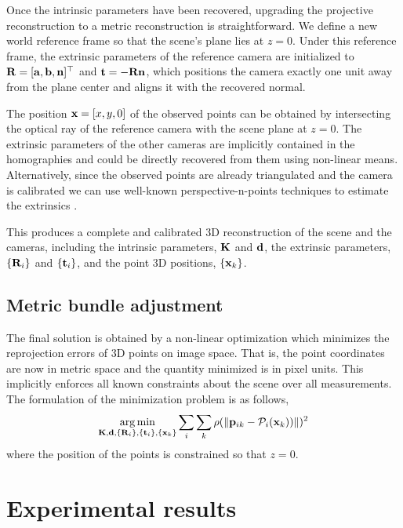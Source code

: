 \documentclass[10pt,twocolumn,letterpaper]{article}
\begin{document}
Once the intrinsic parameters have been recovered, upgrading the projective reconstruction to a metric reconstruction is straightforward. We define a new world reference frame so that the scene's plane lies at $z=0$. Under this reference frame, the extrinsic parameters of the reference camera are initialized to $\mathbf{R}=[\mathbf{a}, \mathbf{b}, \mathbf{n}]^\top$ and $\mathbf{t}= - \mathbf{R} \mathbf{n}$, which positions the camera exactly one unit away from the plane center and aligns it with the recovered normal.

The position $\mathbf{x}=[x,y,0]$ of the observed points can be obtained by intersecting the optical ray of the reference camera with the scene plane at $z=0$. The extrinsic parameters of the other cameras are implicitly contained in the homographies and could be directly recovered from them using non-linear means. Alternatively, since the observed points are already triangulated and the camera is calibrated we can use well-known perspective-n-points techniques to estimate the extrinsics \cite{quan1999}.

This produces a complete and calibrated 3D reconstruction of the scene and the cameras, including the intrinsic parameters, $\mathbf{K}$ and $\mathbf{d}$, the extrinsic parameters, $\lbrace \mathbf{R}_i \rbrace$ and $\lbrace \mathbf{t}_i \rbrace$, and the point 3D positions, $\lbrace \mathbf{x}_k \rbrace$.

\subsection{Metric bundle adjustment}

The final solution is obtained by a non-linear optimization which minimizes the reprojection errors of 3D points on image space. That is, the point coordinates are now in metric space and the quantity minimized is in pixel units. This implicitly enforces all known constraints about the scene over all measurements. The formulation of the minimization problem is as follows, 
%
\begin{align}
\argmin_{\Km,\dv,\lbrace \Rm_i \rbrace,\lbrace \tv_i \rbrace, \lbrace \xv_k \rbrace} 
%
\sum_i \sum_k \rho(\norm{\pv_{ik} - \Projection_i(\xv_k))})^2 
\end{align}
%
where the position of the points is constrained so that $z=0$. 

\section{Experimental results}
\label{sec:results}
\end{document}
